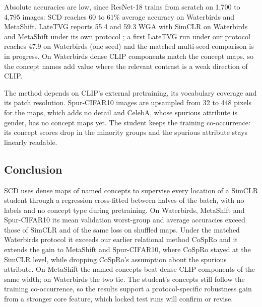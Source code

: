 \documentclass{article}
\begin{document}
Absolute accuracies are low, since ResNet-18 trains from scratch on 1,700 to 4,795 images: SCD reaches 60 to 61\% average accuracy on Waterbirds and MetaShift. LateTVG reports 55.4 and 59.3 WGA with SimCLR on Waterbirds and MetaShift under its own protocol \citep{hamidieh2024latetvg}; a first LateTVG run under our protocol reaches 47.9 on Waterbirds (one seed) and the matched multi-seed comparison is in progress. On Waterbirds dense CLIP components match the concept maps, so the concept names add value where the relevant contrast is a weak direction of CLIP.

The method depends on CLIP's external pretraining, its vocabulary coverage and its patch resolution. Spur-CIFAR10 images are upsampled from 32 to 448 pixels for the maps, which adds no detail and CelebA, whose spurious attribute is gender, has no concept maps yet. The student keeps the training co-occurrence: its concept scores drop in the minority groups and the spurious attribute stays linearly readable.

\begin{samepage}
\section{Conclusion}
SCD uses dense maps of named concepts to supervise every location of a SimCLR student through a regression cross-fitted between halves of the batch, with no labels and no concept type during pretraining. On Waterbirds, MetaShift and Spur-CIFAR10 its mean validation worst-group and average accuracies exceed those of SimCLR and of the same loss on shuffled maps. Under the matched Waterbirds protocol it exceeds our earlier relational method CoSpRo and it extends the gain to MetaShift and Spur-CIFAR10, where CoSpRo stayed at the SimCLR level, while dropping CoSpRo's assumption about the spurious attribute. On MetaShift the named concepts beat dense CLIP components of the same width; on Waterbirds the two tie. The student's concepts still follow the training co-occurrence, so the results support a protocol-specific robustness gain from a stronger core feature, which locked test runs will confirm or revise.
\end{samepage}
\end{document}
